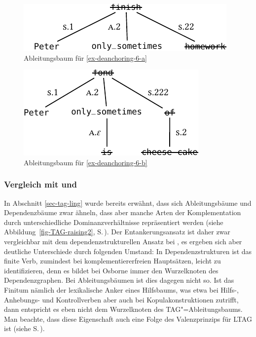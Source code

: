 \begin{figure}[t]
\centering
\includegraphics{graphics/abb819.pdf}
\caption{\label{fig-deanchoring-6}Ableitungsbaum für \ref{ex-deanchoring-6-a} \citep[Figure~8]{Lichte:Kallmeyer:10}}
\end{figure}

\begin{figure}[t]
\centering
\includegraphics{graphics/abb820.pdf}
\caption{\label{fig-deanchoring-7}Ableitungsbaum für \ref{ex-deanchoring-6-b} \citep[Figure~9]{Lichte:Kallmeyer:10}}
\end{figure}

\subsubsection*{Vergleich mit \cite{Osborne:08} und \cite{Kobele:09}}

In Abschnitt \ref{sec-tag-ling} wurde bereits erwähnt, dass sich Ableitungsbäume und Dependenzbäume zwar ähneln, dass aber manche Arten der Komplementation durch unterschiedliche Dominanzverhältnisse repräsentiert werden (siehe Abbildung~\ref{fig-TAG-raising2}, S.\,\pageref{fig-TAG-raising2}). Der Ent\-ankerungs\-ansatz ist daher zwar vergleichbar mit dem dependenzstrukturellen Ansatz bei \cite{Osborne:08}, es ergeben sich aber deutliche Unterschiede durch folgenden Umstand: In Dependenzstrukturen ist das finite Verb, zumindest bei komplementiererfreien Hauptsätzen, leicht zu identifizieren, denn es bildet bei Osborne immer den Wurzelknoten des Dependenzgraphen. Bei Ableitungsbäumen ist dies dagegen nicht so. Ist das Finitum nämlich der lexikalische Anker eines Hilfsbaums, was etwa bei Hilfs-, Anhebungs- und Kontrollverben aber auch bei Kopulakonstruktionen zutrifft, dann entspricht es eben nicht dem Wurzelknoten des TAG"=Ableitungsbaums. Man beachte, dass diese Eigenschaft auch eine Folge des Valenzprinzips für LTAG ist (siehe S.\,\pageref{ex-valenzprinzip-tag}).  

